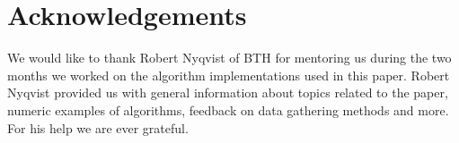 \chapter{Acknowledgements}

\noindent We would like to thank Robert Nyqvist of BTH for mentoring us during the two months we worked on the algorithm implementations used in this paper. Robert Nyqvist provided us with general information about topics related to the paper, numeric examples of algorithms, feedback on data gathering methods and more. For his help we are ever grateful.
